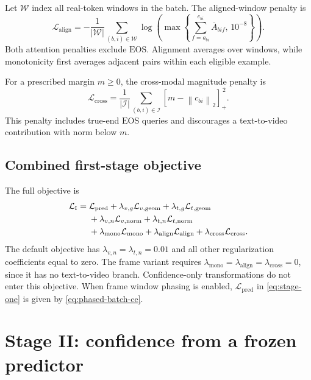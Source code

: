 \documentclass[11pt,a4paper]{article}
\newcommand{\EOS}{\mathrm{EOS}}
\newcommand{\norm}[1]{\left\lVert #1\right\rVert}
\newcommand{\pos}[1]{\left[#1\right]_{+}}
\numberwithin{equation}{section}
\begin{document}
Let $\mathcal W$ index all real-token windows in the batch. The
aligned-window penalty is
\begin{equation}
\mathcal L_{\mathrm{align}}
=-\frac{1}{|\mathcal W|}\sum_{(b,i)\in\mathcal W}
 \log\!\left(\max\!\left\{
     \sum_{f=a_{bi}}^{e_{bi}}\overline A_{bif},\,10^{-8}
 \right\}\right).
\label{eq:aligned}
\end{equation}
Both attention penalties exclude $\EOS$. Alignment averages over
windows, while monotonicity first averages adjacent pairs within each
eligible example.

For a prescribed margin $m\geq0$, the cross-modal magnitude penalty is
\begin{equation}
\mathcal L_{\mathrm{cross}}
=\frac1{|\mathcal I|}\sum_{(b,i)\in\mathcal I}
 \pos{m-\norm{c_{bi}}_2}^{\,2}.
\end{equation}
This penalty includes true-end $\EOS$ queries and discourages a
text-to-video contribution with norm below $m$.

\subsection{Combined first-stage objective}

The full objective is
\begin{align}
\mathcal L_{\mathrm I}={}&\mathcal L_{\mathrm{pred}}
 +\lambda_{v,g}\mathcal L_{v,\mathrm{geom}}
 +\lambda_{t,g}\mathcal L_{t,\mathrm{geom}}\notag\\
 &+\lambda_{v,n}\mathcal L_{v,\mathrm{norm}}
 +\lambda_{t,n}\mathcal L_{t,\mathrm{norm}}\notag\\
 &+\lambda_{\mathrm{mono}}\mathcal L_{\mathrm{mono}}
 +\lambda_{\mathrm{align}}\mathcal L_{\mathrm{align}}
 +\lambda_{\mathrm{cross}}\mathcal L_{\mathrm{cross}}.
\label{eq:stage-one}
\end{align}
The default objective has $\lambda_{v,n}=\lambda_{t,n}=0.01$ and all
other regularization coefficients equal to zero. The frame variant
requires $\lambda_{\mathrm{mono}}=\lambda_{\mathrm{align}}
=\lambda_{\mathrm{cross}}=0$, since it has no text-to-video branch.
Confidence-only transformations do not enter this objective.
When frame window phasing is enabled, $\mathcal L_{\mathrm{pred}}$ in
\eqref{eq:stage-one} is given by \eqref{eq:phased-batch-ce}.

\section{Stage II: confidence from a frozen predictor}
\end{document}
